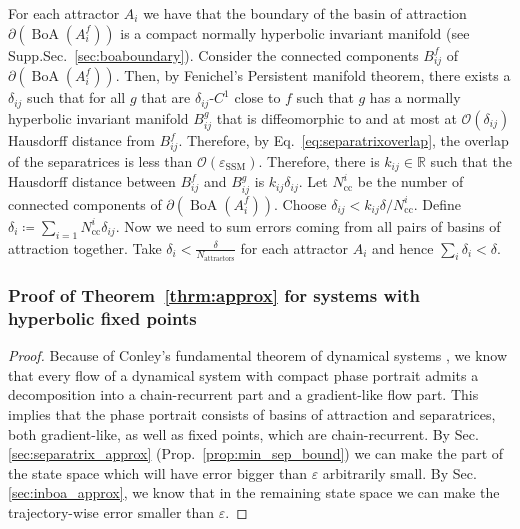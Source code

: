 \documentclass{article}
\newcommand{\reals}{\mathbb{R}}
\newcommand{\boa}{\operatorname{BoA}}
\newcounter{ct}
\begin{document}
For each attractor $A_i$ we have that the boundary of the basin of attraction $\partial(\boa(A_i^f))$ is a compact normally hyperbolic invariant manifold (see Supp.Sec.~\ref{sec:boaboundary}).
Consider the connected components $B^f_{ij}$ of $\partial(\boa(A_i^f))$. %
Then, by Fenichel's Persistent manifold theorem, there exists a $\delta_{ij}$ such that for all $g$ that are $\delta_{ij}$-$C^1$ close to $f$ such that $g$ has a normally hyperbolic invariant manifold  $B^g_{ij}$ that is diffeomorphic to and at most at $\mathcal{O}(\delta_{ij})$ Hausdorff distance from $B^f_{ij}$.
Therefore, by Eq.~\ref{eq:separatrixoverlap}, the overlap of the separatrices is less than $\mathcal{O}(\varepsilon_{\operatorname{SSM}})$. %
Therefore, there is $k_{ij}\in\reals$ such that the Hausdorff distance between $B^f_{ij}$ and $B^g_{ij}$ is $k_{ij}\delta_{ij}$.
Let  $N_{\operatorname{cc}}^i$ be the number of connected components of $\partial(\boa(A_i^f))$.
Choose $\delta_{ij}<k_{ij}\delta/N_{\operatorname{cc}}^i$. 
Define $\delta_i\coloneqq\sum_{i=1}{N_{\operatorname{cc}}^i}\delta_{ij}$.
Now we need to sum errors coming from all pairs of basins of attraction together.
Take $\delta_i< \frac{\delta}{N_{\operatorname{attractors}}}$ for each attractor $A_i$ and hence $\sum_i\delta_i<\delta$.


\subsubsection{Proof of Theorem~\ref{thrm:approx} for systems with hyperbolic fixed points}\label{sec:proof_fp_approx}
\begin{proof}%
Because of Conley's fundamental theorem of dynamical systems \citep{conley1978morse}, we know that every flow of a dynamical system with compact phase portrait admits a decomposition into a chain-recurrent part and a gradient-like flow part.
This implies that the phase portrait consists of basins of attraction and separatrices, both gradient-like, as well as fixed points, which are chain-recurrent.
%
By Sec.\ref{sec:separatrix_approx} (Prop.~\ref{prop:min_sep_bound}) we can make the part of the state space which will have error bigger than $\varepsilon$ arbitrarily small. %
By Sec.\ref{sec:inboa_approx}, we know that in the remaining state space we can make the trajectory-wise error smaller than $\varepsilon$.
\end{proof}
\end{document}
